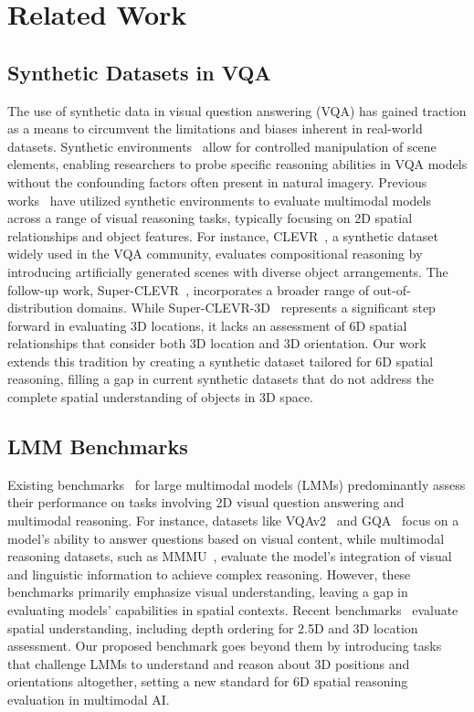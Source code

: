 \section{Related Work}
\subsection{Synthetic Datasets in VQA}
The use of synthetic data in visual question answering (VQA) has gained traction as a means to circumvent the limitations and biases inherent in real-world datasets. Synthetic environments~\cite{hess2013blender, qiu2016unrealcv, sanders2016introduction} allow for controlled manipulation of scene elements, enabling researchers to probe specific reasoning abilities in VQA models without the confounding factors often present in natural imagery. Previous works~\cite{johnson2017clevr, lindstrom2022clevr, li2023super} have utilized synthetic environments to evaluate multimodal models across a range of visual reasoning tasks, typically focusing on 2D spatial relationships and object features. For instance, CLEVR~\cite{johnson2017clevr}, a synthetic dataset widely used in the VQA community, evaluates compositional reasoning by introducing artificially generated scenes with diverse object arrangements. The follow-up work, Super-CLEVR~\cite{li2023super}, incorporates a broader range of out-of-distribution domains. While Super-CLEVR-3D~\cite{wang20243d} represents a significant step forward in evaluating 3D locations, it lacks an assessment of 6D spatial relationships that consider both 3D location and 3D orientation. Our work extends this tradition by creating a synthetic dataset tailored for 6D spatial reasoning, filling a gap in current synthetic datasets that do not address the complete spatial understanding of objects in 3D space.

\subsection{LMM Benchmarks}
Existing benchmarks~\cite{goyal2017making, hudson2019gqa, singh2019towards, yue2024mmmu} for large multimodal models (LMMs) predominantly assess their performance on tasks involving 2D visual question answering and multimodal reasoning. For instance, datasets like VQAv2~\cite{goyal2017making} and GQA~\cite{hudson2019gqa} focus on a model's ability to answer questions based on visual content, while multimodal reasoning datasets, such as MMMU~\cite{yue2024mmmu}, evaluate the model's integration of visual and linguistic information to achieve complex reasoning. However, these benchmarks primarily emphasize visual understanding, leaving a gap in evaluating models' capabilities in spatial contexts. Recent benchmarks~\cite{tong2024cambrian,chen2024spatialvlm,cheng2024spatialrgpt} evaluate spatial understanding, including depth ordering for 2.5D and 3D location assessment. Our proposed benchmark goes beyond them by introducing tasks that challenge LMMs to understand and reason about 3D positions and orientations altogether, setting a new standard for 6D spatial reasoning evaluation in multimodal AI.


\vspace{-0.3em}